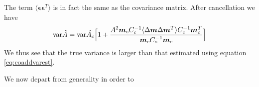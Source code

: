 \documentclass[a4paper,fleqn,usenatbib,referee]{mnras}
\begin{document}
The term $\langle \boldsymbol{\epsilon} \boldsymbol{\epsilon}^T \rangle$ is in fact the
same as the covariance matrix.  After cancellation we have
\begin{align*}
    {\rm var}\hat{A} = {\rm var}\hat{A_c} \Bigl[ 1 + \frac{A^2 \boldsymbol{m}_c C_c^{-1} \langle \Delta \boldsymbol{m} \Delta \boldsymbol{m}^T\rangle C_c^{-1} \boldsymbol{m}_c^T}{\boldsymbol{m}_c C_c^{-1}\boldsymbol{m}_c}  \Bigr]
\end{align*}
We thus see that the true variance is larger than that estimated using
equation \ref{eq:coaddvarest}.

We now depart from generality in order to 

%
%
\end{document}
